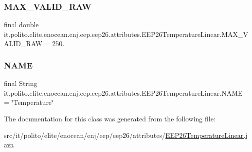 \subsubsection{\texorpdfstring{M\+A\+X\+\_\+\+V\+A\+L\+I\+D\+\_\+\+R\+AW}{MAX\_VALID\_RAW}}
{\footnotesize\ttfamily final double it.\+polito.\+elite.\+enocean.\+enj.\+eep.\+eep26.\+attributes.\+E\+E\+P26\+Temperature\+Linear.\+M\+A\+X\+\_\+\+V\+A\+L\+I\+D\+\_\+\+R\+AW = 250.\hspace{0.3cm}{\ttfamily [static]}}

\hypertarget{classit_1_1polito_1_1elite_1_1enocean_1_1enj_1_1eep_1_1eep26_1_1attributes_1_1_e_e_p26_temperature_linear_a06fca6591e0634e3474d2ce888b20e84}{}\label{classit_1_1polito_1_1elite_1_1enocean_1_1enj_1_1eep_1_1eep26_1_1attributes_1_1_e_e_p26_temperature_linear_a06fca6591e0634e3474d2ce888b20e84} 
\subsubsection{\texorpdfstring{N\+A\+ME}{NAME}}
{\footnotesize\ttfamily final String it.\+polito.\+elite.\+enocean.\+enj.\+eep.\+eep26.\+attributes.\+E\+E\+P26\+Temperature\+Linear.\+N\+A\+ME = \char`\"{}Temperature\char`\"{}\hspace{0.3cm}{\ttfamily [static]}}



The documentation for this class was generated from the following file\+:\begin{DoxyCompactItemize}
\item 
src/it/polito/elite/enocean/enj/eep/eep26/attributes/\hyperlink{_e_e_p26_temperature_linear_8java}{E\+E\+P26\+Temperature\+Linear.\+java}\end{DoxyCompactItemize}
